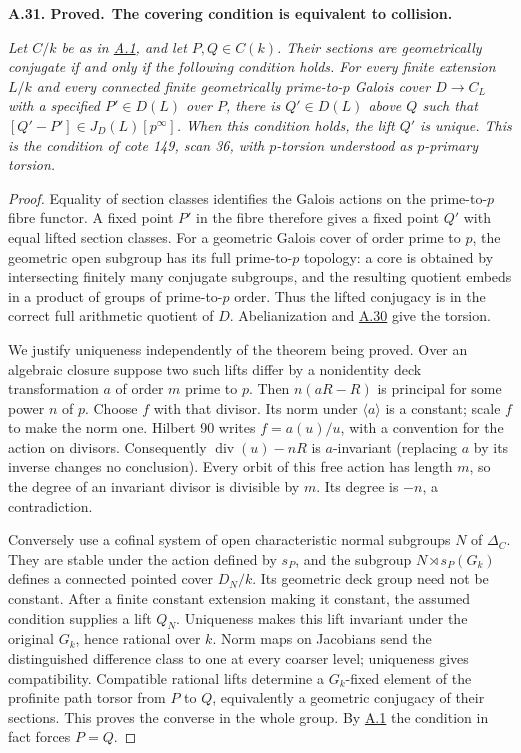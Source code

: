 \documentclass[11pt,a4paper]{article}
\newenvironment{claim}[3]{\par\medskip\noindent\hypertarget{#1}{\textbf{#1. #2.}}\ \textbf{#3.}\par\nopagebreak\smallskip\begingroup\itshape}{\endgroup\par\smallskip}
\newcommand{\statementref}[1]{\hyperlink{#1}{#1}}
\begin{document}
\begin{claim}{A.31}{Proved}{The covering condition is equivalent to collision}
Let $C/k$ be as in \statementref{A.1}, and let $P,Q\in C(k)$.
Their sections are geometrically conjugate if and only if the
following condition holds. For every finite extension $L/k$ and every
connected finite \emph{geometrically} prime-to-$p$ Galois cover
$D\to C_L$ with a specified $P'\in D(L)$ over $P$, there is
$Q'\in D(L)$ above $Q$ such that
$[Q'-P']\in J_D(L)[p^\infty]$. When this condition holds, the lift
$Q'$ is unique. This is the condition of cote 149, scan 36, with
\emph{$p$-torsion} understood as $p$-primary torsion.
\end{claim}
\begin{proof}
Equality of section classes identifies the Galois actions on the
prime-to-$p$ fibre functor. A fixed point $P'$ in the fibre therefore
gives a fixed point $Q'$ with equal lifted section classes. For a
geometric Galois cover of order prime to $p$, the geometric open
subgroup has its full prime-to-$p$ topology: a core is obtained by
intersecting finitely many conjugate subgroups, and the resulting
quotient embeds in a product of groups of prime-to-$p$ order.
Thus the lifted conjugacy is in the correct full arithmetic quotient
of $D$. Abelianization and \statementref{A.30} give the torsion.

We justify uniqueness independently of the theorem being proved.
Over an algebraic closure suppose two such lifts differ by a
nonidentity deck transformation $a$ of order $m$ prime to $p$.
Then $n(aR-R)$ is principal for some power $n$ of $p$. Choose $f$
with that divisor. Its norm under $\langle a\rangle$ is a constant;
scale $f$ to make the norm one. Hilbert 90 writes
$f=a(u)/u$, with a convention for the action on divisors.
Consequently $\operatorname{div}(u)-nR$ is $a$-invariant (replacing
$a$ by its inverse changes no conclusion). Every orbit of this free
action has length $m$, so the degree of an invariant divisor is
divisible by $m$. Its degree is $-n$, a contradiction.

Conversely use a cofinal system of open characteristic normal
subgroups $N$ of $\Delta_C$. They are stable under the action defined
by $s_P$, and the subgroup $N\rtimes s_P(G_k)$ defines a connected
pointed cover $D_N/k$. Its geometric deck group need not be constant.
After a finite constant extension making it constant, the assumed
condition supplies a lift $Q_N$. Uniqueness makes this lift invariant
under the original $G_k$, hence rational over $k$. Norm maps on
Jacobians send the distinguished difference class to one at every
coarser level; uniqueness gives compatibility. Compatible rational
lifts determine a $G_k$-fixed element of the profinite path torsor
from $P$ to $Q$, equivalently a geometric conjugacy of their sections.
This proves the converse in the whole group. By \statementref{A.1}
the condition in fact forces $P=Q$.
\end{proof}
\end{document}

